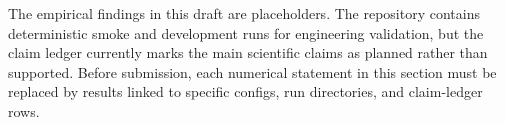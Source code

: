 The empirical findings in this draft are placeholders. The repository contains deterministic smoke and development runs for engineering validation, but the claim ledger currently marks the main scientific claims as planned rather than supported. Before submission, each numerical statement in this section must be replaced by results linked to specific configs, run directories, and claim-ledger rows.
